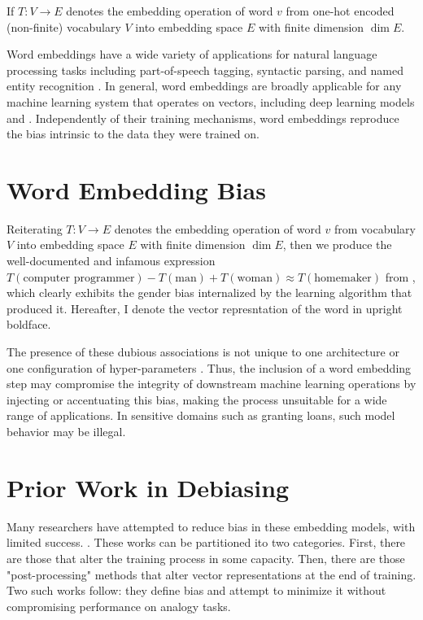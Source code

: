 \documentclass[11pt,a4paper]{article}
\begin{document}
If $T : V \to E$ denotes the embedding operation of word $v$ from
one-hot encoded (non-finite) vocabulary $V$ into embedding space $E$ with finite
dimension $\dim E$.

Word embeddings have a wide variety of applications for natural language
processing tasks including part-of-speech tagging, syntactic parsing, and named
entity recognition \cite{lison2017redefining}. In general, word embeddings are
broadly applicable for any machine learning system that operates on vectors,
including deep learning models and . Independently of their training mechanisms,
word embeddings reproduce the bias intrinsic to the data they were trained on.

\section{Word Embedding Bias}

Reiterating $T : V \to E$ denotes the embedding operation of word $v$ from
vocabulary $V$ into embedding space $E$ with finite dimension $\dim E$, then we
produce the well-documented and infamous expression $ T(\text{computer
programmer}) - T(\mathrm{man}) + T(\mathrm{woman})  \approx
T(\mathrm{homemaker})$ from \cite{biased_analogy-1607-06520}, which clearly
exhibits the gender bias internalized by the learning algorithm that produced
it. Hereafter, I denote the vector represntation of the word in upright
boldface.

The presence of these dubious associations is not unique to one architecture or
one configuration of hyper-parameters \cite{origins-1810-03611}. Thus, the
inclusion of a word embedding step may compromise the integrity of downstream
machine learning operations by injecting or accentuating this bias, making the
process unsuitable for a wide range of applications. In sensitive domains such
as granting loans, such model behavior may be illegal.

\section{Prior Work in Debiasing}

Many researchers have attempted to reduce bias in these embedding models, with
limited success. \citet{caliskan2017semantics}. These works can be partitioned
ito two categories. First, there are those that alter the training process in
some capacity. Then, there are those "post-processing" methods that alter vector
representations at the end of training. Two such works follow: they define bias
and attempt to minimize it without compromising performance on analogy tasks.
\end{document}
